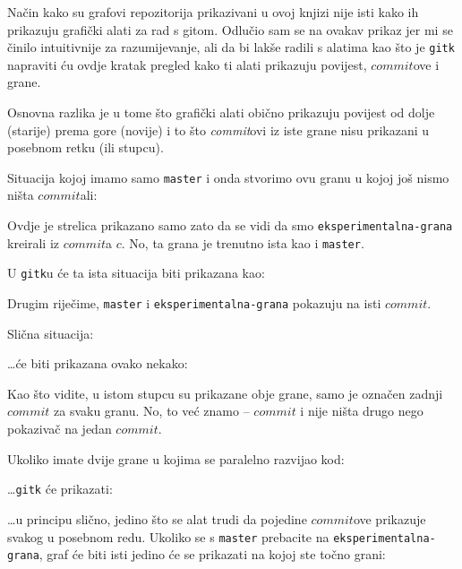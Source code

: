 
Način kako su grafovi repozitorija prikazivani u ovoj knjizi nije isti kako ih prikazuju grafički alati za rad s gitom.
Odlučio sam se na ovakav prikaz jer mi se činilo intuitivnije za razumijevanje, ali da bi lakše radili s alatima kao što je \verb+gitk+ napraviti ću ovdje kratak pregled kako ti alati prikazuju povijest, $commit$ove i grane.

Osnovna razlika je u tome što grafički alati obično prikazuju povijest od dolje (starije) prema gore (novije)
i to što \emph{commit}ovi iz iste grane nisu prikazani u posebnom retku (ili stupcu).


Situacija kojoj imamo samo \verb+master+ i onda stvorimo ovu granu u kojoj još nismo ništa $commit$ali:



Ovdje je strelica prikazano samo zato da se vidi da smo \verb+eksperimentalna-grana+ kreirali iz $commit$a $c$.
No, ta grana je trenutno ista kao i \verb+master+.

U \verb+gitk+u će ta ista situacija biti prikazana kao:


Drugim riječime, \verb+master+ i \verb+eksperimentalna-grana+ pokazuju na isti $commit$.

Slična situacija:



\dots{}će biti prikazana ovako nekako:


Kao što vidite, u istom stupcu su prikazane obje grane, samo je označen zadnji $commit$ za svaku granu.
No, to već znamo -- $commit$ i nije ništa drugo nego pokazivač na jedan $commit$.

Ukoliko imate dvije grane u kojima se paralelno razvijao kod:



\dots{}\verb+gitk+ će prikazati:


\dots{}u principu slično, jedino što se alat trudi da pojedine $commit$ove prikazuje svakog u posebnom redu.
Ukoliko se s \verb+master+ prebacite na \verb+eksperimentalna-grana+, graf će biti isti jedino će se prikazati na kojoj ste točno grani:

